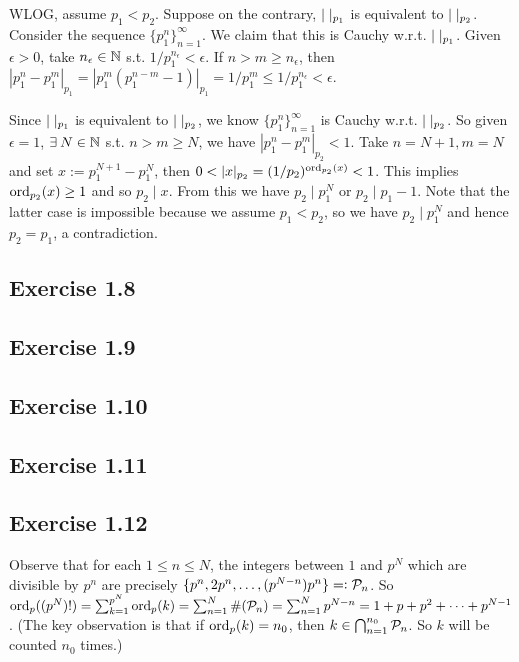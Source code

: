 \documentclass[../Koblitz.tex]{subfiles}
\begin{document}
WLOG, assume $p_1<p_2$. Suppose on the contrary, $|\;|_{p_1}$ is equivalent to $|\;|_{p_2}$. Consider the sequence $\{p_1^n\}_{n=1}^\infty$. We claim that this is Cauchy w.r.t. $|\;|_{p_1}$. Given $\epsilon>0$, take $n_\epsilon\in\mathbb{N}$ s.t. $1/p_1^{n_\epsilon}<\epsilon$. If $n>m\geq n_\epsilon$, then $|p_1^n-p_1^m|_{p_1} = |p_1^m(p_1^{n-m}-1)|_{p_1} = 1/p_1^m \leq 1/p_1^{n_\epsilon} < \epsilon$.

Since $|\;|_{p_1}$ is equivalent to $|\;|_{p_2}$, we know $\{p_1^n\}_{n=1}^\infty$ is Cauchy w.r.t. $|\;|_{p_2}$. So given $\epsilon=1$, $\exists N\in\NN$ s.t. $n>m\geq N$, we have $|p_1^n-p_1^m|_{p_2}<1$. Take $n=N+1,m=N$ and set $x:=p_1^{N+1}-p_1^N$, then $0<|x|_{p_2} = (1/p_2)^{\ord_{p_2}(x)} < 1$. This implies $\operatorname{ord}_{p_2}(x) \geq1$ and so $p_2\mid x$. From this we have $p_2\mid p_1^N$ or $p_2\mid p_1-1$. Note that the latter case is impossible because we assume $p_1<p_2$, so we have $p_2\mid p_1^N$ and hence $p_2=p_1$, a contradiction.

\subsection*{Exercise 1.8}

\subsection*{Exercise 1.9}

\subsection*{Exercise 1.10}

\subsection*{Exercise 1.11}

\subsection*{Exercise 1.12}

Observe that for each $1\leq n\leq N$, the integers between $1$ and $p^N$ which are divisible by $p^n$ are precisely $\{p^n,2p^n,\ldots,(p^{N-n})p^n\}=:\mathcal{P}_n$. So $\operatorname{ord}_p((p^N)!) = \sum_{k=1}^{p^N} \operatorname{ord}_p(k) = \sum_{n=1}^N \#(\mathcal{P}_n) = \sum_{n=1}^N p^{N-n} = 1 + p + p^2 + \cdots + p^{N-1}$. (The key observation is that if $\operatorname{ord}_p(k)=n_0$, then $k\in \bigcap_{n=1}^{n_0} \mathcal{P}_n$. So $k$ will be counted $n_0$ times.)
\end{document}
